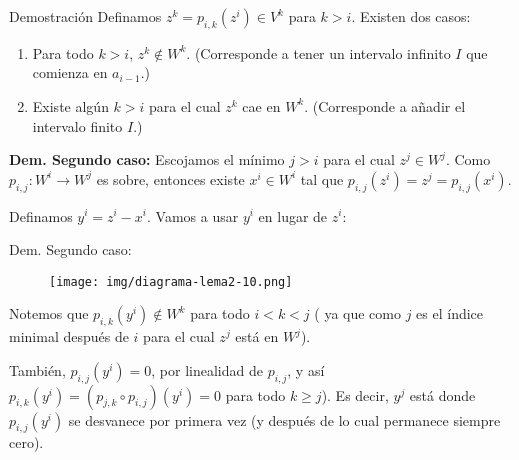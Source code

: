 \documentclass{beamer}
\begin{document}
\begin{frame}{Demostración}
    Definamos $z^k = p_{i,k} (z^i) \in V^k$ para $k>i$. \pause Existen dos casos:
\begin{enumerate}
	\item
		Para todo $k>i$, $z^k\notin W^k$. (Corresponde a tener un intervalo infinito $I$ que comienza en $a_{i-1}$.) \pause
	\item
		Existe algún $k>i$ para el cual $z^k$ cae en $W^k$.
		(Corresponde a añadir el intervalo finito $I$.)\\[0.5cm]
\end{enumerate}
\pause 


\textbf{Dem. Segundo caso:}
Escojamos el mínimo $j > i$ para el cual $z^j \in W^j$.
Como $p_{i,j} : W^i \to W^{j}$ es sobre, entonces existe $x^i \in W^i$ tal que 
$p_{i,j} (z^i) = z^j = p_{i,j} (x^i)$. \pause 

Definamos $y^i = z^i - x^i$. Vamos a usar $y^i$ en lugar de $z^i$:

\end{frame}

\begin{frame}{Dem. Segundo caso:}
 
\begin{figure}
    \centering
    \texttt{[image: img/diagrama-lema2-10.png]}
    \label{fig:diagram-lema-210}
\end{figure}

Notemos que $p_{i,k}(y^i) \notin W^k$ para todo $i<k<j$ ( ya que como $j$ es el índice minimal después de $i$ para el cual $z^j$ está en $W^j$). \pause

También, $p_{i,j} (y^i) = 0$, por linealidad de $p_{i,j}$, y así $p_{i,k} (y^i) = (p_{j,k} \circ p_{i,j}) (y^i) = 0$ para todo $k\geq j$). \pause Es decir, $y^j$ está donde $p_{i,j} (y^i)$ se desvanece por primera vez (y después de lo cual permanece siempre cero).


\end{frame}
\end{document}
